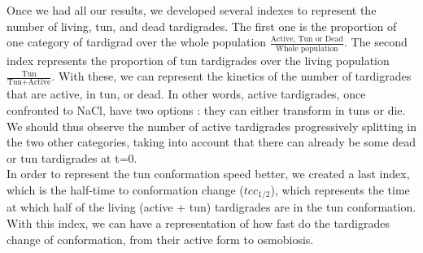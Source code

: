 \documentclass[12pt,a4paper, twocolumn]{article}
\begin{document}
Once we had all our results, we developed several indexes to represent the number of living, tun, and dead tardigrades. The first one is the proportion of one category of tardigrad over the whole population $\frac{\text{Active, Tun or Dead}}{\text{Whole population}}$. The second index represents the proportion of tun tardigrades over the living population $\frac{\text{Tun}}{\text{Tun}+ \text{Active}}$. With these, we can represent the kinetics of the number of tardigrades that are active, in tun, or dead. In other words, active tardigrades, once confronted to NaCl, have two options : they can either transform in tuns or die. We should thus observe the number of active tardigrades progressively splitting in the two other categories, taking into account that there can already be some dead or tun tardigrades at t=0.\\

In order to represent the tun conformation speed better, we created a last index, which is the half-time to conformation change ($tcc_{1/2}$), which represents the time at which half of the living (active + tun) tardigrades are in the tun conformation. With this index, we can have a representation of how fast do the tardigrades change of conformation, from their active form to osmobiosis.
\end{document}

